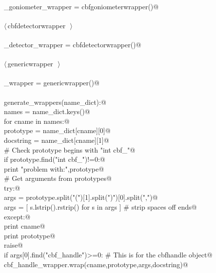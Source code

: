 \documentclass[10pt,a4paper,twoside,notitlepage]{article}
\begin{document}
\begin{flushleft}
\begin{list}{}{}
\mbox{}\verb@@\\
\mbox{}\verb@cbf_goniometer_wrapper = cbfgoniometerwrapper()@\\
\mbox{}\verb@@\\
\mbox{}\verb@@\hbox{$\langle\,$cbfdetectorwrapper\nobreak\ {\footnotesize {}}$\,\rangle$}\verb@@\\
\mbox{}\verb@@\\
\mbox{}\verb@cbf_detector_wrapper = cbfdetectorwrapper()@\\
\mbox{}\verb@@\\
\mbox{}\verb@@\hbox{$\langle\,$genericwrapper\nobreak\ {\footnotesize {}}$\,\rangle$}\verb@@\\
\mbox{}\verb@@\\
\mbox{}\verb@generic_wrapper = genericwrapper()@\\
\mbox{}\verb@@\\
\mbox{}\verb@def generate_wrappers(name_dict):@\\
\mbox{}\verb@   names = name_dict.keys()@\\
\mbox{}\verb@   for cname in names:@\\
\mbox{}\verb@      prototype = name_dict[cname][0]@\\
\mbox{}\verb@      docstring = name_dict[cname][1]@\\
\mbox{}\verb@      # Check prototype begins with "int cbf_"@\\
\mbox{}\verb@      if prototype.find("int cbf_")!=0:@\\
\mbox{}\verb@         print "problem with:",prototype@\\
\mbox{}\verb@      # Get arguments from prototypes@\\
\mbox{}\verb@      try:@\\
\mbox{}\verb@         args = prototype.split("(")[1].split(")")[0].split(",")@\\
\mbox{}\verb@         args = [ s.lstrip().rstrip() for s in args ] # strip spaces off ends@\\
\mbox{}\verb@      except:@\\
\mbox{}\verb@         print cname@\\
\mbox{}\verb@         print prototype@\\
\mbox{}\verb@         raise@\\
\mbox{}\verb@      if args[0].find("cbf_handle")>=0: # This is for the cbfhandle object@\\
\mbox{}\verb@         cbf_handle_wrapper.wrap(cname,prototype,args,docstring)@\\

\end{list}
\end{flushleft}
\end{document}
